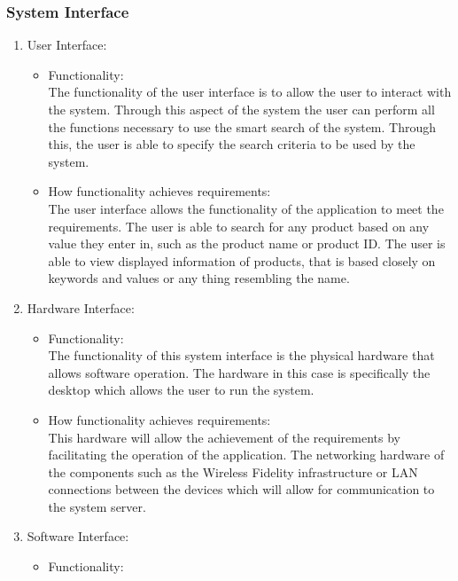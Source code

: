 \documentclass[a4paper,10pt]{article}
\begin{document}
        \subsubsection{System Interface}{
			\begin{enumerate} 
				\item User Interface:
					\begin{itemize}
				\item Functionality:\\
					The functionality of the user interface is to allow the user to interact with the system. Through this aspect of the system the user can perform all the functions necessary to use the smart search of the system. Through this, the user is able to specify the search criteria to be used by the system.\\
				\item How functionality achieves requirements:\\	
					The user interface allows the functionality of the application to meet the requirements. The user is able to search for any product based on any value they enter in, such as the product name or product ID. The user is able to view displayed information of products, that is based closely on keywords and values or any thing resembling the name. \\
					\end{itemize}
				\item Hardware Interface:
					\begin{itemize}
					\item Functionality:\\
					The functionality of this system interface is the physical hardware that allows software operation. The hardware in this case is specifically the desktop which allows the user to run the system.\\
				\item How functionality achieves requirements:\\
					This hardware will allow the achievement of the requirements by facilitating the operation of the application. The networking hardware of the components such as the Wireless Fidelity infrastructure or LAN connections between the devices which will allow for communication to the system server.
				\end{itemize}
				\item Software Interface:
					\begin{itemize}
					\item Functionality:\\

\end{itemize}
\end{enumerate}}
\end{document}
